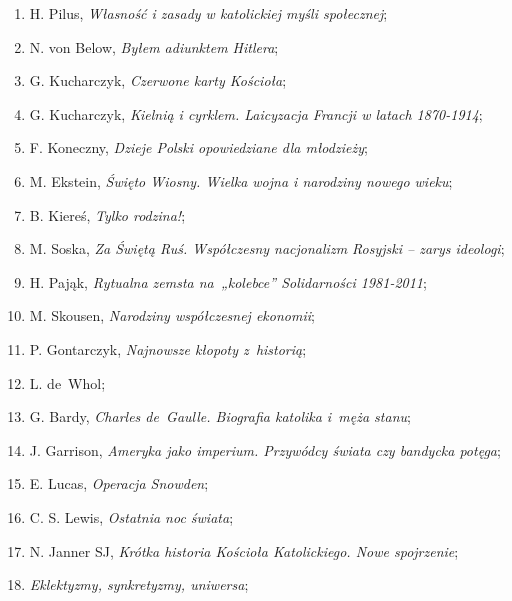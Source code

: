 \documentclass[a4paper,11pt]{article}
\begin{document}
\begin{enumerate}
\item H. Pilus, \emph{Własność i zasady w katolickiej myśli
    społecznej};

\item N. von Below, \emph{Byłem adiunktem Hitlera};

\item G. Kucharczyk, \emph{Czerwone karty Kościoła};

\item G. Kucharczyk, \emph{Kielnią i cyrklem. Laicyzacja Francji w
    latach 1870-1914};

\item F. Koneczny, \emph{Dzieje Polski opowiedziane dla młodzieży};

\item M. Ekstein, \emph{Święto Wiosny. Wielka wojna i narodziny nowego
    wieku};

\item B. Kiereś, \emph{Tylko rodzina!};

\item M. Soska, \emph{Za Świętą Ruś. Współczesny nacjonalizm Rosyjski
    -- zarys ideologi};

\item H. Pająk, \emph{Rytualna zemsta na~„kolebce” Solidarności
    1981-2011};

\item M. Skousen, \emph{Narodziny współczesnej ekonomii};

\item P. Gontarczyk, \emph{Najnowsze kłopoty z~historią};

\item L. de~Whol;

\item G. Bardy, \emph{Charles de~Gaulle. Biografia katolika i~męża
    stanu};

\item J. Garrison, \emph{Ameryka jako imperium. Przywódcy świata czy
    bandycka potęga};

\item E. Lucas, \emph{Operacja Snowden};

\item C. S. Lewis, \emph{Ostatnia noc świata};

\item N. Janner SJ, \emph{Krótka historia Kościoła Katolickiego. Nowe
    spojrzenie};

\item \emph{Eklektyzmy, synkretyzmy, uniwersa};


\end{enumerate}
\end{document}
